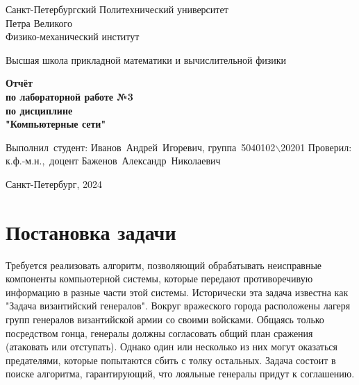 \documentclass[12pt,a4paper]{article}
\begin{document}
	
	\begin{titlepage}
		
		\begin{center}
			\begin{large}
				Санкт-Петербургский Политехнический университет\\ Петра Великого\\
				Физико-механический институт\\
			\end{large}
			\vspace{0.2cm}
			Высшая школа прикладной математики и вычислительной физики\\
			
		\end{center}
		
		\vspace{3cm}
		\begin{center}
			\textbf{Отчёт\\ по лабораторной работе №3\\ по дисциплине\\ "Компьютерные сети"}
		\end{center}
		
		\vspace{3cm}
		
		\vbox{%
			\hfill%
			\vbox{%
				\hbox{Выполнил студент:}%
				\hbox{\break}
				\hbox{Иванов Андрей Игоревич,}%
				\hbox{группа 5040102$\backslash$20201}%
				\hbox{\break}
				\hbox{\break}
				\hbox{Проверил:}
				\hbox{\break}
				\hbox{к.ф.-м.н., доцент}
				\hbox{Баженов Александр Николаевич}
			}%
		} 
		\vfill
		
		\begin{center}
			Санкт-Петербург, 2024
		\end{center}
	
	\end{titlepage}
	\tableofcontents
	\newpage
		
	\section{Постановка задачи}
        Требуется реализовать алгоритм, позволяющий обрабатывать неисправные компоненты компьютерной системы, которые передают противоречивую информацию в разные части этой системы. Исторически эта задача известна как "Задача византийский генералов".\newline \newline
        Вокруг вражеского города расположены лагеря групп генералов византийской армии со своими войсками. Общаясь только посредством гонца, генералы должны согласовать общий план сражения (атаковать или отступать). Однако один или несколько из них могут оказаться предателями, которые попытаются сбить с толку остальных. Задача состоит в поиске алгоритма, гарантирующий, что лояльные генералы придут к соглашению.
	\newpage
	
\end{document}
